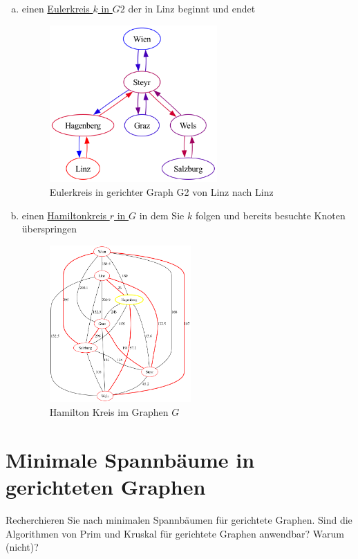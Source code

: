 \documentclass[a4paper,11pt]{report}
\begin{document}
\begin{enumerate}[a)]
        \item einen \hyperref[fig:a04_euler]{Eulerkreis $k$ in $G2$} der in Linz beginnt und endet
        \begin{figure}[htbp]
            \centering
            \includegraphics[height=6cm]{a04a_euler}
            \caption{Eulerkreis in gerichter Graph G2 von Linz nach Linz}
            \label{fig:a04_euler}
        \end{figure}

        \item einen \hyperref[fig:a04_hamilton]{Hamiltonkreis $r$ in $G$} in dem Sie $k$ folgen und bereits besuchte Knoten
        überspringen
        \begin{figure}[htbp]
            \centering
            \includegraphics[height=6cm]{a04a_hamilton_highlighted}
            \caption{Hamilton Kreis im Graphen $G$}
            \label{fig:a04_hamilton}
        \end{figure}

    \end{enumerate}

    \newpage

    \chapter{Minimale Spannbäume in gerichteten Graphen}
    \label{ch:minSbDiGraph}
    Recherchieren Sie nach minimalen Spannbäumen für gerichtete Graphen.
    Sind die Algorithmen von Prim und Kruskal für gerichtete Graphen anwendbar?
    Warum (nicht)?
\end{document}
